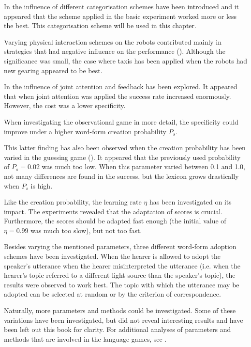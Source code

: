 In  the influence of different categorisation schemes have been introduced and it appeared that the scheme applied in the basic experiment worked more or less the best. This categorisation scheme will be used in this chapter. 

Varying physical interaction schemes on the robots contributed mainly in strategies that had negative influence on the performance (). Although the significance was small, the case where taxis has been applied when the robots had new gearing appeared to be best.

In  the influence of joint attention and feedback has been explored. It appeared that when joint attention was applied the success rate increased enormously. However, the cost was a lower specificity.

When investigating the observational game in more detail, the specificity could improve under a higher word-form creation probability $P_s$. 

This latter finding has also been observed when the creation probability has been varied in the guessing game (). It appeared that the previously used probability of $P_s=0.02$ was much too low. When this parameter varied between 0.1 and 1.0, not many differences are found in the success, but the lexicon grows drastically when $P_s$ is high.

Like the creation probability, the learning rate $\eta$ has been investigated on its impact. The experiments revealed that the adaptation of scores is crucial. Furthermore, the scores should be adapted fast enough (the initial value of $\eta=0.99$ was much too slow), but not too fast.

Besides varying the mentioned parameters, three different word-form adoption schemes have been investigated. When the hearer is allowed to adopt the speaker's utterance when the hearer misinterpreted the utterance (i.e. when the hearer's topic referred to a different light source than the speaker's topic), the results were observed to work best. The topic with which the utterance may be adopted can be selected at random or by the criterion of correspondence. 


Naturally, more parameters and methods could be investigated. Some of these variations have been investigated, but did not reveal interesting results and have been left out this book for clarity. For additional analyses of parameters and methods that are involved in the language games, see \cite{dejong:2000,kaplan:2000}.

